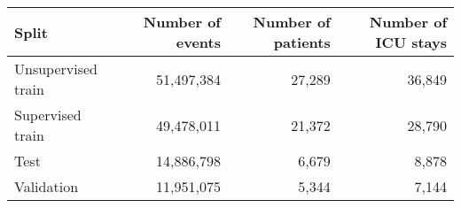 \begin{tabular}{lrrr}
\toprule
Split & Number of events & Number of patients & Number of ICU stays \\
\midrule
Unsupervised train & 51,497,384 & 27,289 & 36,849 \\
Supervised train & 49,478,011 & 21,372 & 28,790 \\
Test & 14,886,798 & 6,679 & 8,878 \\
Validation & 11,951,075 & 5,344 & 7,144 \\
\bottomrule
\end{tabular}
